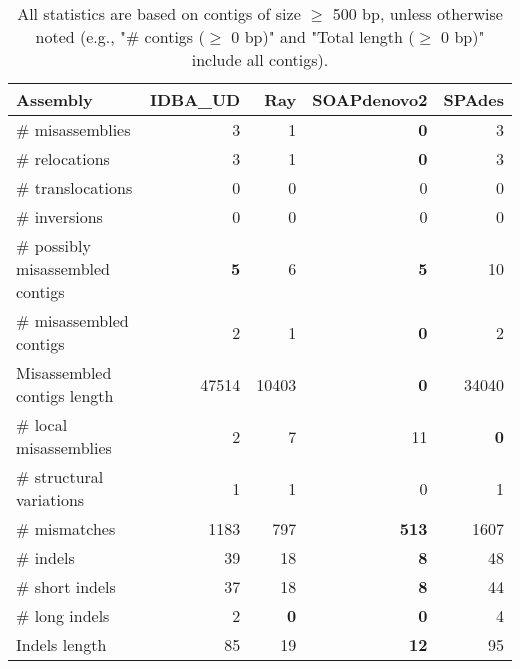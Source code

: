 \documentclass[12pt,a4paper]{article}
\begin{document}
\begin{table}[ht]
\begin{center}
\caption{All statistics are based on contigs of size $\geq$ 500 bp, unless otherwise noted (e.g., "\# contigs ($\geq$ 0 bp)" and "Total length ($\geq$ 0 bp)" include all contigs).}
\begin{tabular}{|l*{4}{|r}|}
\hline
Assembly & IDBA\_UD & Ray & SOAPdenovo2 & SPAdes \\ \hline
\# misassemblies & 3 & 1 & {\bf 0} & 3 \\ \hline
\hspace{5mm}\# relocations & 3 & 1 & {\bf 0} & 3 \\ \hline
\hspace{5mm}\# translocations & 0 & 0 & 0 & 0 \\ \hline
\hspace{5mm}\# inversions & 0 & 0 & 0 & 0 \\ \hline
\# possibly misassembled contigs & {\bf 5} & 6 & {\bf 5} & 10 \\ \hline
\# misassembled contigs & 2 & 1 & {\bf 0} & 2 \\ \hline
Misassembled contigs length & 47514 & 10403 & {\bf 0} & 34040 \\ \hline
\# local misassemblies & 2 & 7 & 11 & {\bf 0} \\ \hline
\# structural variations & 1 & 1 & 0 & 1 \\ \hline
\# mismatches & 1183 & 797 & {\bf 513} & 1607 \\ \hline
\# indels & 39 & 18 & {\bf 8} & 48 \\ \hline
\hspace{5mm}\# short indels & 37 & 18 & {\bf 8} & 44 \\ \hline
\hspace{5mm}\# long indels & 2 & {\bf 0} & {\bf 0} & 4 \\ \hline
Indels length & 85 & 19 & {\bf 12} & 95 \\ \hline
\end{tabular}
\end{center}
\end{table}
\end{document}
